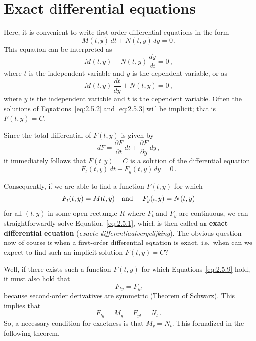 \section{Exact differential equations}
Here, it is convenient to write first-order differential equations in the form
\begin{equation} \label{eq:2.5.1}
M(t,y)\,d t+N(t,y)\,d y=0\,.
\end{equation}
This equation  can be interpreted as
\begin{equation} \label{eq:2.5.2}
M(t,y)+N(t,y)\,\dfrac{d y}{d t}=0\,,
\end{equation}
where $t$ is the independent variable and $y$ is the dependent variable, or as
\begin{equation} \label{eq:2.5.3}
M(t,y)\,\dfrac{d t}{d y}+N(t,y)=0\,,
\end{equation}
where $y$ is the independent variable and $t$ is the dependent variable. Often the solutions of Equations~\eqref{eq:2.5.2} and \eqref{eq:2.5.3} will be implicit; that is $F(t,y)=C$. 

Since the total differential of $F(t,y)$ is given by
$$
d F=\dfrac{\partial F}{\partial t}\,d t+\dfrac{\partial F}{\partial y}\,d y\,,
$$
it immediately follows that $F(t,y)=C$ is a solution of the differential equation
\begin{equation} \label{eq:2.5.4}
F_t(t,y)\,d t+F_y(t,y)\,d y=0\,.
\end{equation}

Consequently, if we are able to find a function $F(t,y)$ for which 
\begin{equation} \label{eq:2.5.9}
F_t(t,y)=M(t,y) \mbox{\quad and \quad} F_y(t,y)=N(t,y)
\end{equation}
for  all  $(t,y)$ in some open rectangle $R$ where $F_t$ and $F_y$ are continuous, we can straightforwardly solve Equation~\eqref{eq:2.5.1}, which is then called an \textbf{exact differential equation} (\textit{exacte differentiaalvergelijking}). The obvious question now of course is when a first-order differential equation is exact, i.e.\ when can we expect to find such an implicit solution $F(t,y)=C$?

Well, if there exists such a function $F(t,y)$ for which Equations~\eqref{eq:2.5.9} hold, it must also hold that 
$$
F_{ty}=F_{yt}
$$
because second-order derivatives are symmetric (Theorem of Schwarz). This implies that
\begin{equation} \label{eq:2.5.11}
F_{ty}=M_y= F_{yt}=N_t\,.
\end{equation}
So, a necessary condition for exactness is that $M_y=N_t$. This formalized in the following theorem. 


